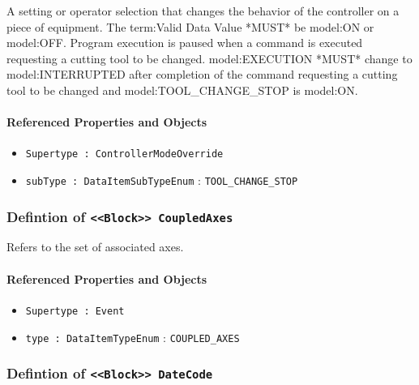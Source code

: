 \FloatBarrier

A setting or operator selection that changes the behavior of the controller on a piece of equipment. 
 The {term:Valid Data Value} *MUST* be {model:ON} or {model:OFF}. 
 Program execution is paused when a command is executed requesting a cutting tool to be changed. 
 {model:EXECUTION} *MUST* change to {model:INTERRUPTED} after completion of the command requesting a cutting tool to be changed and {model:TOOL_CHANGE_STOP} is {model:ON}.

\FloatBarrier
\paragraph{Referenced Properties and Objects}

\begin{itemize}
\item \texttt{Supertype : ControllerModeOverride}

\item \texttt{subType : DataItemSubTypeEnum} : \texttt{TOOL_CHANGE_STOP}

\end{itemize}
\FloatBarrier
\subsubsection{Defintion of \texttt{<<Block>> CoupledAxes}}
  \label{type:CoupledAxes}

\FloatBarrier

Refers to the set of associated axes.

\FloatBarrier
\paragraph{Referenced Properties and Objects}

\begin{itemize}
\item \texttt{Supertype : Event}

\item \texttt{type : DataItemTypeEnum} : \texttt{COUPLED_AXES}

\end{itemize}
\FloatBarrier
\subsubsection{Defintion of \texttt{<<Block>> DateCode}}
  \label{type:DateCode}

\FloatBarrier

